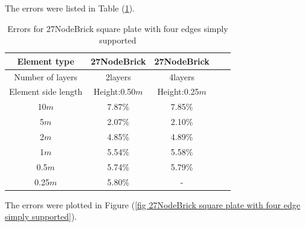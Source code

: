 \documentclass[fleqn,11pt]{article}
\begin{document}

The errors were listed in Table (\ref{table Errors for 27NodeBrick square plate with four edges simply supported}).

\begin{table}[H]
  \centering
  \caption{Errors for 27NodeBrick square plate with four edges simply supported}
  \label{table Errors for 27NodeBrick square plate with four edges simply supported}
\begin{tabular}{|c|c|c|c|c|}
\hline
Element type        & 27NodeBrick     & 27NodeBrick      \\ \hline
Number of layers         & 2layers         & 4layers          \\ \hline
Element side length  & Height:0.50$m$ & Height:0.25$m$  \\ \hline
10$m$                & 7.87\% & 7.85\%        \\ \hline
5$m$                 & 2.07\% & 2.10\%        \\ \hline
2$m$                 & 4.85\% & 4.89\%        \\ \hline
1$m$                 & 5.54\% & 5.58\%        \\ \hline
0.5$m$               & 5.74\% & 5.79\%        \\ \hline
0.25$m$              & 5.80\% &    -           \\
\hline
\end{tabular}
\end{table}


The errors were plotted in Figure (\ref{fig 27NodeBrick square plate with four edge simply supported}).
\end{document}
